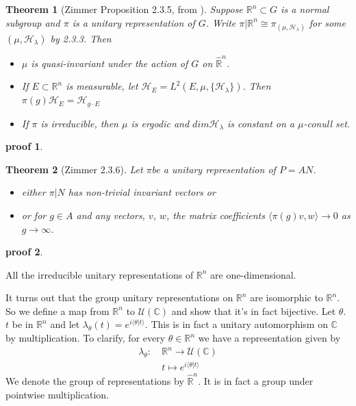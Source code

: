 \documentclass[
  12pt
]{article}
\theoremstyle{break}
\newtheorem{thm}{Theorem}
\theoremstyle{plain}
\newtheorem*{pf}{proof}
\newcommand{\mpi}{\ensuremath{\pi}}
\begin{document}
  \begin{thm}[Zimmer Proposition 2.3.5, from  \cite{mackey76}]
    \label{thm:2.3.5}
    Suppose $\mathbb{R}^n \subset G$ is a normal subgroup and $\pi$ is a unitary representation of $G$.
    Write $\pi | \mathbb{R}^n \cong \pi_{(\mu, \mathscr{H}_{\lambda})}$ for some
    $(\mu, \mathscr{H}_{\lambda})$ by 2.3.3. Then  
    \begin{itemize}
      \item $\mu$ is quasi-invariant under the action of $G$ on $\hat{\mathbb{R}}^n$. 
      \item If $E \subset \mathbb{R}^n$ is measurable, let
        $\mathscr{H}_E = L^2(E, \mu, \{\mathscr{H}_{\lambda}\})$.
        Then $\pi(g)\mathscr{H}_E = \mathscr{H}_{g \cdot E}$
      \item If $\pi$ is irreducible, then $\mu$ is ergodic and $dim\mathscr{H}_{\lambda}$ is
        constant on a $\mu$-conull set.
    \end{itemize}
  \end{thm}

  \begin{pf}
  \end{pf}

  \begin{thm}[Zimmer 2.3.6]
    \label{thm:2.3.6}
    Let \mpi be  a unitary representation of $P = AN$.
    \begin{itemize}
      \item either $\pi|N$ has non-trivial invariant vectors or
      \item or for $g \in A$ and any vectors, $v$, $w$, the matrix coefficients
        $\langle \pi(g)v, w \rangle \rightarrow 0$ as $g \rightarrow \infty$.
    \end{itemize}
  \end{thm}

  \begin{pf}
  \end{pf}


  All the irreducible unitary
  representations of $\mathbb{R}^n$ are one-dimensional.

  It turns out that the group unitary representations on $\mathbb{R}^n$
  are isomorphic to $\mathbb{R}^n$. So we define a map from
  $\mathbb{R}^n$ to $\mathcal{U}(\mathbb{C})$ and show that it's in
  fact bijective. Let $\theta$. $t$ be in $\mathbb{R}^n$ and let
  $\lambda_{\theta}(t) = e^{i\langle \theta | t \rangle}$. This is in
  fact a unitary automorphism on $\mathbb{C}$ by multiplication. To
  clarify, for every $\theta \in \mathbb{R}^n$ we have a representation
  given by
  \begin{align*}
    \lambda_{\theta}:\ & \mathbb{R}^n \rightarrow \mathcal{U}(\mathbb{C}) \\
    & t \mapsto e^{i \langle \theta | t \rangle}
  \end{align*}
  We denote the group of representations by $\hat{\mathbb{R}}^n$. It
  is in fact a group under pointwise multiplication.
\end{document}
